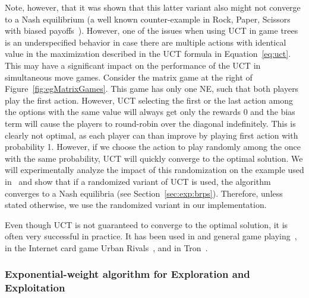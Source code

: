 Note, however, that it was shown that this latter variant also might not converge to a Nash equilibrium (a well known counter-example in Rock, Paper, Scissors with biased payoffs~\cite{Shafiei09}). 
However, one of the issues when using UCT in game trees is an underspecified behavior in case there are multiple actions with identical value in the maximization described in the UCT formula in Equation~\ref{eq:uct}.
This may have a significant impact on the performance of the UCT in simultaneous move games. 
Consider the matrix game at the right of Figure~\ref{fig:egMatrixGames}. 
This game has only one NE, such that both players play the first action. However, UCT selecting the first or the last action among the options with the same value will always get only the rewards 0 and the bias term will cause the players to round-robin over the diagonal indefinitely. This is clearly not optimal, as each player can than improve by playing first action with probability 1. However, if we choose the action to play randomly among the once with the same probability, UCT will quickly converge to the optimal solution. 
We will experimentally analyze the impact of this randomization on the example used in~\cite{Shafiei09} and show that if a randomized variant of UCT is used, the algorithm converges to a Nash equilibria (see Section~\ref{sec:exp:brps}).
Therefore, unless stated otherwise, we use the randomized variant in our implementation.

Even though UCT is not guaranteed to converge to the optimal solution, it is often very successful in practice.
It has been used in and general game playing~\cite{Finnsson12}, in the Internet card game Urban Rivals~\cite{Teytaud11Upper},
and in Tron~\cite{Perick12Comparison}.


\subsubsection{Exponential-weight algorithm for Exploration and Exploitation}\label{sec:exp3}

